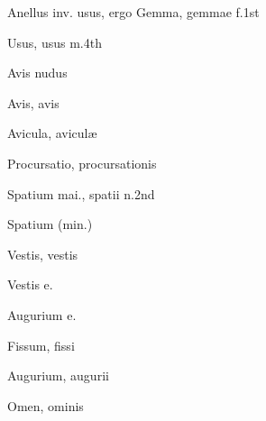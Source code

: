  {\mktsStyleItalic{}Anellus inv. usus\/}, ergo {\mktsStyleItalic{}Gemma\/}, gemmae {\mktsStyleItalic{}f.1st\/}


 {\mktsStyleItalic{}Usus\/}, usus {\mktsStyleItalic{}m.4th\/}


 {\mktsStyleItalic{}Avis nudus\/}


 {\mktsStyleItalic{}Avis\/}, avis


 {\mktsStyleItalic{}Avicula\/}, aviculæ


 {\mktsStyleItalic{}Procursatio\/}, procursationis


 {\mktsStyleItalic{}Spatium mai.\/}, spatii {\mktsStyleItalic{}n.2nd\/}


 {\mktsStyleItalic{}Spatium (min.)\/}


 {\mktsStyleItalic{}Vestis\/}, vestis


 {\mktsStyleItalic{}Vestis e.\/}


 {\mktsStyleItalic{}Augurium e.\/}


 {\mktsStyleItalic{}Fissum\/}, fissi


 {\mktsStyleItalic{}Augurium\/}, augurii


 {\mktsStyleItalic{}Omen\/}, ominis


